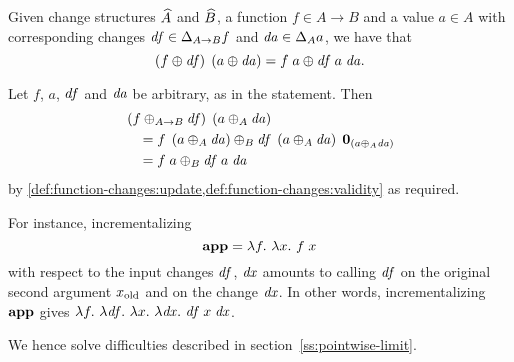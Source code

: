 \begin{theorem}[Incrementalization]
  \label{thm:incrementalization}
  Given change structures $\widehat{A}$ and $\widehat{B}$, a function $f \in A \to B$
  and a value $a \in A$ with corresponding changes $\D f \in
  \Change[A \to B]{f}$ and $\D a \in \Change[A]{a}$, we have that
  \[\App{\Apply*{\D f}{f}}{\Apply*{\D a}{a}}
  = \Apply{\App{\App{\D f}{a}}{\D a}}{\App{f}{a}}\text{.}\qed\]
\end{theorem}

\begin{optionalproof}

  Let $f$, $a$, $\mathit{df}$ and $\mathit{da}$ be arbitrary, as in the statement. Then
  \begin{align*}
    & \App{\Apply*[A \to B]{\D f}{f}}{\Apply*[A]{\D a}{a}}\\
    & \quad = \Apply[B]{\App{\App{\D f}{\TheNewValue}}{\NilC{\TheNewValue}}}{\App{f}{\TheNewValue}}\\
    & \quad = \Apply[B]{\App{\App{\D f}{a}}{\D a}}{\App{f}{a}}
  \end{align*}
  by
  \cref{def:function-changes:update,def:function-changes:validity}
  as required.
\end{optionalproof}

For instance,
incrementalizing
\[
\APPFun = \Lam{f}{\Lam{x}{\App f x}}
\]
with respect to the input changes $\mathit{df}$, $\mathit{dx}$ amounts to
calling $\mathit{df}$ on the original second argument $x_{\textrm{old}}$ and on
the change $\mathit{dx}$. In other words, incrementalizing $\textbf{app}$ gives
$\Lam{f} {\Lam{\D f} {\Lam{x} {\Lam{\D x} {\App {\App {\D f} x} {\D x}}}}}$.
\begin{oldSec}
We hence solve difficulties described in
section~\ref{ss:pointwise-limit}.
\end{oldSec}

